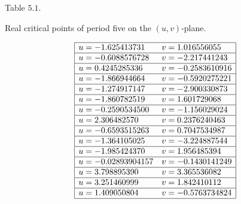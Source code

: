\documentclass[12pt,a4paper]{amsart}
\numberwithin{equation}{section}
\numberwithin{lause}{section}
\begin{document}
\begin{table}[h]
\begin{center}
Table $5.1$.
\end{center}
\begin{center}
 Real critical points of period five on the $(u,v)$-plane.
\end{center}
\begin{displaymath}
\begin{array}{|ll|}
       \hline

                   u=-1.625413731& v=1.016556055 \\\hline  u=-0.6088576728 & v= -2.217441243  \\\hline      u=0.4245285336 & v=-0.2583610916  \\\hline u=-1.866944664& v=-0.5920275221  \\\hline              u=-1.274917147& v=-2.900330873  \\\hline u=-1.860782519& v=1.601729068\\\hline
                     u=-0.2590534500& v=-1.156029024\\\hline
                     u= 2.306482570& v=0.2376240463\\\hline u=-0.6593515263& v=0.7047534987\\\hline  u=-1.364105025& v=-3.224887544\\\hline u=-1.985424370& v=1.956485394\\\hline
                        u=-0.02893904157& v=-0.1430141249\\\hline     u= 3.798895390& v=3.365536082\\\hline
                       u=3.251460999& v=1.842410112\\\hline  u= 1.409050804& v=-0.5763734824\\\hline
\end{array}
\end{displaymath}
\end{table}
\end{document}
